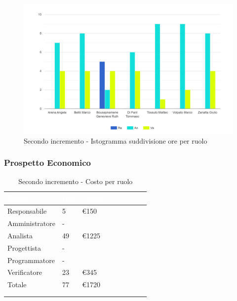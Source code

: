 {{\begin{longtable}{C{.4\freewidth} C{.1\freewidth} C{.1\freewidth} C{.1\freewidth} C{.1\freewidth} C{.1\freewidth} C{.1\freewidth} C{.1\freewidth} C{.1\freewidth}}
      \end{longtable} 
      \begin{figure}[H]
        \includegraphics[width=15cm]{sezioni/Images/secondo.png}
        \centering
        \caption{Secondo incremento - Istogramma suddivisione ore per ruolo}
     \end{figure}
      
    }
    

    \subsubsection{Prospetto Economico}
    {
        \setlength{\freewidth}{\dimexpr\textwidth-30\tabcolsep}
        \renewcommand{\arraystretch}{1.0}
        \setlength{\aboverulesep}{0pt}
        \setlength{\belowrulesep}{0pt}
        \begin{longtable}{C{.4\freewidth} C{.2\freewidth} C{.2\freewidth} C{.2\freewidth} C{.2\freewidth} C{.2\freewidth} C{.2\freewidth} C{.2\freewidth} C{.2\freewidth}}
          \toprule
        \textcolor{white}{\textbf{Ruolo}}&
        \textcolor{white}{\textbf{Ore}}&
        \textcolor{white}{\textbf{Costo}}\\
        \toprule
        \endhead
            
        Responsabile  & 5 & €150\\        
        Amministratore  & -&  \\        
        Analista &49 & €1225\\        
        Progettista &- &\\        
        Programmatore &- & \\        
        Verificatore &23 &€345\\        
        Totale&77&€1720\\
        \bottomrule
      	\\
        \caption{Secondo incremento - Costo per ruolo}


\end{longtable}}}

